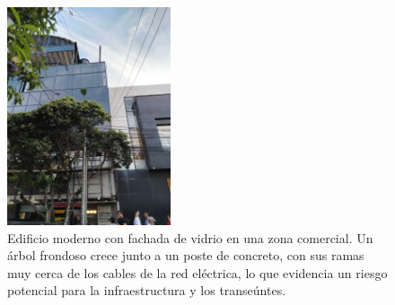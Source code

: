 \begin{figure}[H]
    \centering
    \includegraphics[width=0.43\textwidth, height=0.43\textwidth]{fig_/9}
    \caption{Edificio moderno con fachada de vidrio en una zona comercial. Un árbol frondoso crece junto a un poste de concreto, con sus ramas muy cerca de los cables de la red eléctrica, lo que evidencia un riesgo potencial para la infraestructura y los transeúntes.}
    \label{fig:a9}
\end{figure}


